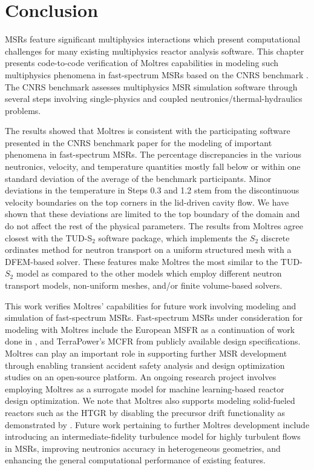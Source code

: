 \section{Conclusion}

\glspl{MSR} feature significant multiphysics interactions which present
computational challenges for many existing multiphysics reactor analysis
software. This chapter presents code-to-code verification of Moltres
capabilities in modeling such multiphysics phenomena in fast-spectrum
\glspl{MSR} based on the CNRS benchmark \cite{tiberga_results_2020}.
The CNRS benchmark assesses multiphysics \gls{MSR} simulation
software through several steps involving single-physics and coupled
neutronics/thermal-hydraulics problems.

The results showed that Moltres is consistent with the participating software
presented in the CNRS benchmark paper for the modeling of important phenomena
in fast-spectrum \glspl{MSR}. The percentage discrepancies in the various
neutronics, velocity, and temperature quantities mostly fall below or within
one standard deviation of the average of the benchmark participants.
Minor deviations in the temperature in Steps 0.3 and 1.2 
stem from the discontinuous velocity
boundaries on the top corners in the lid-driven cavity flow. We have shown that
these deviations are limited to the top boundary of the domain and do not
affect the rest of the physical parameters. The results from
Moltres agree closest with the TUD-S$_2$ software package, which implements the
$S_2$ discrete ordinates method for
neutron transport on a uniform structured mesh with a \gls{DFEM}-based solver.
These features make Moltres the most similar to the TUD-$S_2$ model as compared
to the other models which employ different neutron transport models,
non-uniform meshes, and/or finite volume-based solvers.

This work verifies Moltres' capabilities for future work involving modeling and
simulation of fast-spectrum \glspl{MSR}. Fast-spectrum \glspl{MSR}
under consideration for modeling with Moltres include the European \gls{MSFR}
as a continuation of work done in \cite{park_advancement_2020}, and
TerraPower's \gls{MCFR} \cite{terrapower_terrapower_2021} from publicly
available design specifications. Moltres can play an important role in
supporting further \gls{MSR} development through enabling transient accident
safety analysis and design optimization studies on an open-source platform.
An ongoing research project involves employing Moltres as a
surrogate model for machine learning-based reactor design optimization.
We note that Moltres also supports modeling solid-fueled reactors such as the
\gls{HTGR} by disabling the precursor drift functionality as demonstrated by
\cite{fairhurst-agosta_multi-physics_2020}. Future work pertaining to
further Moltres development include introducing an intermediate-fidelity
turbulence model for highly turbulent flows in \glspl{MSR}, improving
neutronics accuracy in heterogeneous geometries, and enhancing the general
computational performance of existing features.


